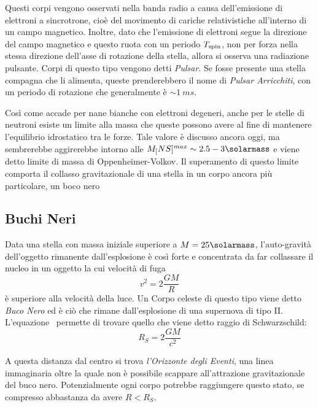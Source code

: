 Questi corpi vengono osservati nella banda radio a causa dell'emissione di elettroni a sincrotrone, cioè del movimento di cariche relativistiche all'interno di un campo magnetico. Inoltre, dato che l'emissione di elettroni segue la direzione del campo magnetico e questo ruota con un periodo $T_{\mbox{\scriptsize{spin}}}$, non per forza nella stessa direzione dell'asse di rotazione della stella, allora si osserva una radiazione pulsante. Corpi di questo tipo vengono detti \textit{Pulsar}. Se fosse presente una stella compagna che li alimenta, queste prenderebbero il nome di \textit{Pulsar Arricchiti}, con un periodo di rotazione che generalmente è $\sim \SI{1}{ms}$.

Così come accade per nane bianche con elettroni degeneri, anche per le stelle di neutroni esiste un limite alla massa che queste possono avere al fine di mantenere l'equilibrio idrostatico tra le forze. Tale valore è discusso ancora oggi, ma sembrerebbe aggirerebbe intorno alle $M_[NS]^{max} \sim 2.5 - 3 \si{\solarmass}$ e viene detto limite di massa di Oppenheimer-Volkov. Il superamento di questo limite comporta il collasso gravitazionale di una stella in un corpo ancora più particolare, un boco nero
\subsection{Buchi Neri}\label{black-holes}

Data una stella con massa iniziale superiore a $M = 25\si{\solarmass}$, l'auto-gravità dell'oggetto rimanente dall'esplosione è così forte e concentrata da far collassare il nucleo in un oggetto la cui velocità di fuga
\begin{equation}\label{eq:fuga}
    v^2 = 2 \frac{GM}{R}
\end{equation}
è superiore alla velocità della luce. Un Corpo celeste di questo tipo viene detto \textit{Buco Nero} ed è ciò che rimane dall'esplosione di una supernova di tipo II. L'equazione~ permette di trovare quello che viene detto raggio di Schwarzschild:
\begin{equation}\label{eq:schwarzschild}
    R_S = 2 \frac{GM}{c^2}
\end{equation}

A questa distanza dal centro si trova \textit{l'Orizzonte degli Eventi}, una linea immaginaria oltre la quale non è possibile scappare all'attrazione gravitazionale del buco nero. Potenzialmente ogni corpo potrebbe raggiungere questo stato, se compresso abbastanza da avere $R<R_S$.

